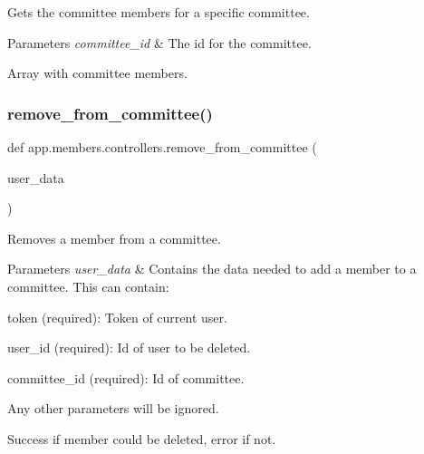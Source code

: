 Gets the committee members for a specific committee. 


\begin{DoxyParams}{Parameters}
{\em committee\+\_\+id} & The id for the committee.\\
\hline
\end{DoxyParams}
Array with committee members. \mbox{\label{namespaceapp_1_1members_1_1controllers_a76a53b46e9b3997b5fac18a82280fce2}} 
\subsubsection{\texorpdfstring{remove\+\_\+from\+\_\+committee()}{remove\_from\_committee()}}
{\footnotesize\ttfamily def app.\+members.\+controllers.\+remove\+\_\+from\+\_\+committee (\begin{DoxyParamCaption}\item[{}]{user\+\_\+data }\end{DoxyParamCaption})}



Removes a member from a committee. 


\begin{DoxyParams}{Parameters}
{\em user\+\_\+data} & Contains the data needed to add a member to a committee. This can contain\+:\\
\hline
\end{DoxyParams}

\begin{DoxyItemize}
\item token (required)\+: Token of current user.
\item user\+\_\+id (required)\+: Id of user to be deleted.
\item committee\+\_\+id (required)\+: Id of committee.
\end{DoxyItemize}

Any other parameters will be ignored.

Success if member could be deleted, error if not. 